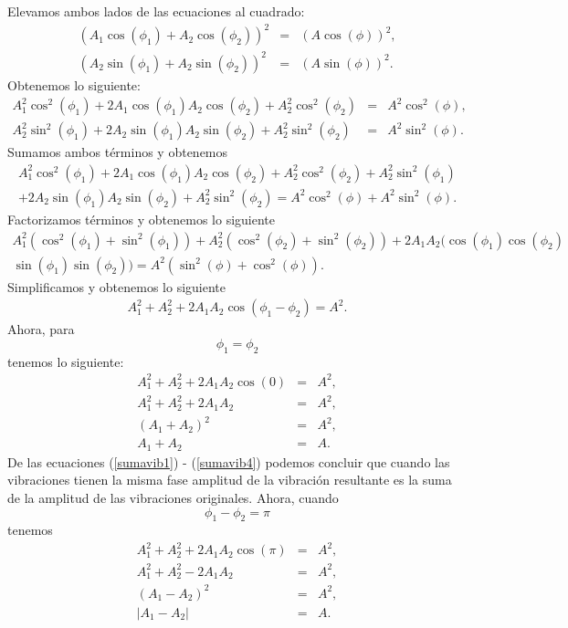 \documentclass[letterpaper,12pt,oneside]{book}
\newcommand{\abs}[1]{\left\lvert#1\right\rvert}
\begin{document}
%
Elevamos ambos lados de las ecuaciones al cuadrado:
%
\begin{eqnarray}
\left(A_1\cos(\phi_1) + A_2\cos(\phi_2) \right)^2&=& \left(A\cos(\phi)\right)^2, \nonumber\\
\left(A_2\sin(\phi_1) + A_2\sin(\phi_2) \right)^2&=& \left(A\sin(\phi)\right)^2. \nonumber
\end{eqnarray}
%
Obtenemos lo siguiente:
\begin{eqnarray}
A_1^2\cos^2(\phi_1) + 2A_1\cos(\phi_1)A_2\cos(\phi_2)+ A_2^2\cos^2(\phi_2) &=& A^2\cos^2(\phi),\nonumber \\
A_2^2\sin^2(\phi_1) + 2A_2\sin(\phi_1)A_2\sin(\phi_2) + A_2^2\sin^2(\phi_2)&=& A^2\sin^2(\phi).\nonumber
\end{eqnarray}
%
Sumamos ambos t\'erminos y obtenemos
%
\begin{eqnarray}
A_1^2\cos^2(\phi_1) + 2A_1\cos(\phi_1)A_2\cos(\phi_2)+ A_2^2\cos^2(\phi_2) + A_2^2\sin^2(\phi_1) \nonumber \\
+ 2A_2\sin(\phi_1)A_2\sin(\phi_2) + A_2^2\sin^2(\phi_2)\nonumber = A^2\cos^2(\phi) + A^2\sin^2(\phi). \nonumber
\end{eqnarray}
%
Factorizamos t\'erminos y obtenemos lo siguiente
%
\begin{eqnarray}
A_1^2(\cos^2(\phi_1)+\sin^2(\phi_1)) + A_2^2(\cos^2(\phi_2)+\sin^2(\phi_2)) + 2A_1A_2(\cos(\phi_1)\cos(\phi_2)\nonumber \\
\sin(\phi_1)\sin(\phi_2))\nonumber = A^2(\sin^2(\phi)+\cos^2(\phi))\nonumber.
\end{eqnarray}
%
Simplificamos y obtenemos lo siguiente
%
\begin{eqnarray}
A_1^2+A_2^2+2A_1A_2\cos(\phi_1-\phi_2)= A^2. \nonumber
\end{eqnarray}
%
Ahora, para
% 
$$\phi_1=\phi_2$$
%
 tenemos lo siguiente:
\begin{eqnarray}
A_1^2+A_2^2+2A_1A_2\cos(0)&=& A^2,\label{sumavib1}\\
A_1^2+A_2^2+2A_1A_2&=&A^2,\label{sumavib2}\\
(A_1+A_2)^2&=&A^2,\label{sumavib3}\\
A_1+A_2&=&A\label{sumavib4}.
\end{eqnarray}
%
De las ecuaciones (\ref{sumavib1}) - (\ref{sumavib4}) podemos concluir que cuando las vibraciones tienen la misma fase amplitud de la vibraci\'on resultante es la suma de la amplitud de las vibraciones originales. Ahora, cuando 
%
$$\phi_1-\phi_2=\pi$$
%
 tenemos
%
\begin{eqnarray}
A_1^2+A_2^2+2A_1A_2\cos\left(\pi\right)&=& A^2,\label{restavib1}\\
A_1^2+A_2^2-2A_1A_2&=&A^2,\label{restavib2}\\
(A_1-A_2)^2&=&A^2,\label{restavib3}\\
\abs{A_1-A_2}&=&A\label{restavib4}.
\end{eqnarray}
\end{document}
